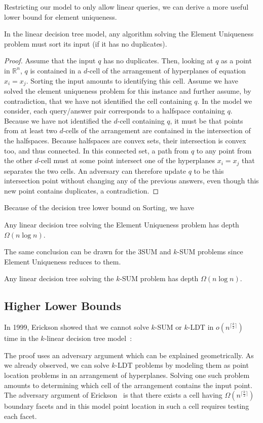 Restricting our model to only allow linear queries,
we can derive a more useful lower bound for element uniqueness.
\begin{lemma}[%
	name={Dobkin and Lipton~\cite[Section~4]{DL79}}%
]
	In the linear decision tree model,
	any algorithm solving the
	Element Uniqueness problem
	must
	sort its input (if it has no duplicates).
\end{lemma}
\begin{proof}
	Assume that the input \(q\) has no duplicates.
	Then, looking at \(q\) as a point in \(\mathbb{R}^n\), \(q\) is contained
	in a \(d\)-cell of the arrangement of hyperplanes of equation
	\(x_i = x_j\).
	Sorting the input amounts to identifying this cell.
	Assume we have solved the element uniqueness problem for this instance
	and further assume, by contradiction,
	that we have not identified the cell containing \(q\).
	In the model we consider, each query/answer pair corresponds to a halfspace
	containing \(q\).
	Because we have not identified the \(d\)-cell containing \(q\), it must be
	that points from at least two \(d\)-cells of the arrangement are contained
	in the intersection of the halfspaces.
	Because halfspaces are convex sets, their intersection is convex too, and
	thus connected. In this connected set, a path
	from \(q\) to any point from the other \(d\)-cell must at some point
	intersect one of the hyperplanes \(x_i = x_j\) that separates the two
	cells.
	An adversary can therefore update \(q\) to be this intersection point
	without changing any of the previous answers, even though this new point
	contains duplicates, a contradiction.
\end{proof}
%
Because of the decision tree lower bound on Sorting, we have
%
\begin{corollary}
	Any linear decision tree solving the
	Element Uniqueness problem
	has depth \(\Omega(n \log n)\).
\end{corollary}
%
The same conclusion can be drawn for the 3SUM and \(k\)-SUM problems since
Element Uniqueness reduces to them.
%
\begin{corollary}
	Any linear decision tree solving the
	\(k\)-SUM problem
	has depth \(\Omega(n \log n)\).
\end{corollary}


\subsection{Higher Lower Bounds}

In 1999, Erickson showed that we cannot solve \(k\)-SUM or
\(k\)-LDT in
$o(n^{\lceil\frac{k}{2}\rceil})$
time in the \(k\)-linear decision tree
model~\cite{Er99a}:
%

%
The proof uses an adversary argument which can be explained geometrically. As
we already observed, we can solve \(k\)-LDT problems by modeling them as point
location problems in an arrangement of hyperplanes. Solving one such problem
amounts to determining which cell of the arrangement contains the input point.
The adversary argument of Erickson~\cite{Er99a} is that there exists a cell having
$\Omega(n^{\lceil\frac{k}{2}\rceil})$ boundary facets and in this model point
location in such a cell requires testing each facet.

